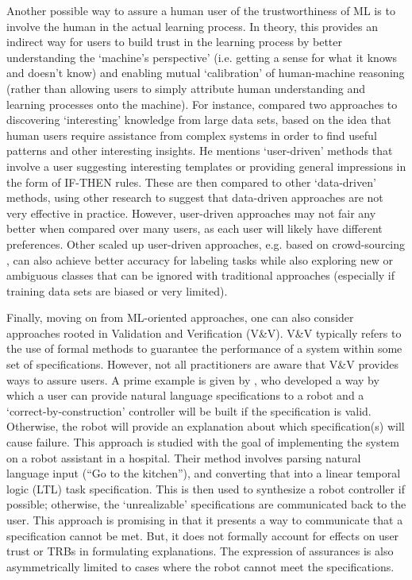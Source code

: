 Another possible way to assure a human user of the trustworthiness of ML is to involve the human in the actual learning process. 
In theory, this provides an indirect way for users to build trust in the learning process by better understanding the `machine's perspective' (i.e. getting a sense for what it knows and doesn't know) and enabling mutual `calibration' of human-machine reasoning (rather than allowing users to simply attribute human understanding and learning processes onto the machine). 
For instance, \citet{Freitas2006-qo} compared two approaches to discovering `interesting' knowledge from large data sets, based on the idea that human users require assistance from complex systems in order to find useful patterns and other interesting insights. 
He mentions `user-driven' methods that involve a user suggesting interesting templates or providing general impressions in the form of IF-THEN rules. 
These are then compared to other `data-driven' methods, using other research to suggest that data-driven approaches are not very effective in practice. 
However, user-driven approaches may not fair any better when compared over many users, as each user will likely have different preferences. 
Other scaled up user-driven approaches, e.g. based on crowd-sourcing \citet{Chang2017-kl}, can also achieve better accuracy for labeling tasks while also exploring new or ambiguous classes that can be ignored with traditional approaches (especially if training data sets are biased or very limited). 

Finally, moving on from ML-oriented approaches, one can also consider approaches rooted in Validation and Verification (V\&V). V\&V typically refers to the use of formal methods to guarantee the performance of a system within some set of specifications. However, not all practitioners are aware that V\&V provides ways to assure users. A prime example is given by \citet{Raman2013-mz}, who developed a way by which a user can provide natural language specifications to a robot and a `correct-by-construction' controller will be built if the specification is valid. Otherwise, the robot will provide an explanation about which specification(s) will cause failure. This approach is studied with the goal of implementing the system on a robot assistant in a hospital. Their method involves parsing natural language input (``Go to the kitchen''), and converting that into a linear temporal logic (LTL) task specification. This is then used to synthesize a robot controller if possible; otherwise, the `unrealizable' specifications are communicated back to the user. This approach is promising in that it presents a way to communicate that a specification cannot be met. But, it does not formally account for effects on user trust or TRBs in formulating explanations. The expression of assurances is also asymmetrically limited to cases where the robot cannot meet the specifications. 

